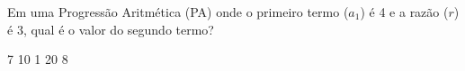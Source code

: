 Em uma Progressão Aritmética (PA) onde o primeiro termo ($a_1$) é 4 e a razão ($r$) é 3, qual é o valor do segundo termo?

7
10
1
20
8





